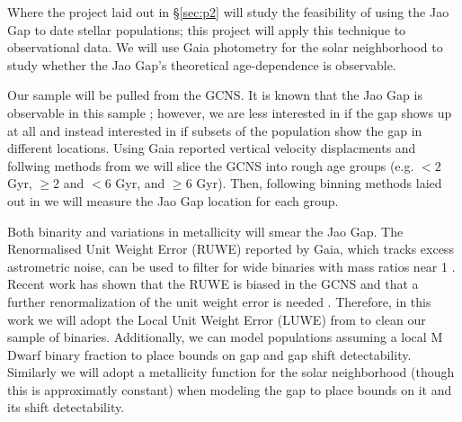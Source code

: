 Where the project laid out in \S \ref{sec:p2} will study the feasibility of
using the Jao Gap to date stellar populations; this project will apply this
technique to observational data. We will use Gaia photometry for the solar
neighborhood to study whether the Jao Gap's theoretical age-dependence is
observable.

Our sample will be pulled from the GCNS. It is known that the Jao Gap is
observable in this sample \citep[Figure 17 in][]{GaiaCollaboration2021};
however, we are less interested in if the gap shows up at all and instead
interested in if subsets of the population show the gap in different locations.
Using Gaia reported vertical velocity displacments and follwing methods from
\citep{Lu2021}  we will slice the GCNS into rough age groups (e.g. $< 2$ Gyr, $\geq
2$ and $< 6$ Gyr, and $\geq 6$ Gyr). Then, following binning methods laied
out in \citet{Jao2018} we will measure the Jao Gap location for each group.

Both binarity and variations in metallicity will smear the Jao Gap. The
Renormalised Unit Weight Error (RUWE) reported by Gaia, which tracks excess
astrometric noise, can be used to filter for wide binaries with mass ratios
near 1 \citep[e.g.][]{Deacon2020, Kervella2022}. Recent work has shown that the
RUWE is biased in the GCNS and that a further renormalization of the unit
weight error is needed \citep{Penoyre2022}. Therefore, in this work we will
adopt the Local Unit Weight Error (LUWE) from \citet{Penoyre2022} to clean our
sample of binaries. Additionally, we can model populations assuming a local M
Dwarf binary fraction \citep{Winters2019} to place bounds on gap and gap shift
detectability. Similarly we will adopt a metallicity function for the solar
neighborhood (though this is approximatly constant) \citep{Holmberg2009} when
modeling the gap to place bounds on it and its shift detectability.
